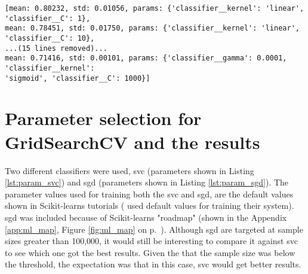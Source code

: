 \begin{lstlisting}[caption={Output from SVC tutorial (testing with linear, rbf and sigmoid)}, label={lst:svc_tutorial}] 
[mean: 0.80232, std: 0.01056, params: {'classifier__kernel': 'linear', 'classifier__C': 1}, 
mean: 0.78451, std: 0.01750, params: {'classifier__kernel': 'linear', 'classifier__C': 10}, 
...(15 lines removed)...
mean: 0.71416, std: 0.00101, params: {'classifier__gamma': 0.0001, 'classifier__kernel': 
'sigmoid', 'classifier__C': 1000}]
\end{lstlisting}

\begin{comment}
Should this be used, is this relevant? Seems a bit like whining over everything that failed, etc.

Another issue was that since few tutorials had the data sets available, it was hard to compare my results against theirs to (considering version changes).
In Scikit-learns tutorial for text data \cite{Scikitlearn.org2016h}, they have at the end task suggestions, with attached solutions in the Scikit-learn library.
When looking at the solution for the second task (sentiment analysis), I saw that they used \gls{sgd} (see \cite{Scikitlearn.org2016f}).
Looking at the suggested "road map" (see Appendix \ref{app:ml_map}, Figure \ref{fig:ml_map} on p.~\pageref{app:ml_map}), 
I accidentally misread a zero and decided to go with \gls{sgd} instead of \gls{svc}.
\vspace{0.5em}\newline
When understanding more about how GridSearchCV worked and how one could select the best parameters from it, things got back on track. 
However, when comparing it against the \gls{svc}, it turned out that the \gls{svc} got a higher score\footnote{
A comparison was done on \gls{sgd}, \gls{svc} and LinearSVC using GridSearchCV.
}. 
\end{comment}


\section{Parameter selection for GridSearchCV and the results}
\label{sec:grid_search_and_results}
Two different classifiers were used, \gls{svc} (parameters shown in Listing \ref{lst:param_svc}) and \gls{sgd} (parameters shown in Listing \ref{lst:param_sgd}).
The parameter values used for training both the \gls{svc} and \gls{sgd}, are the default values shown in Scikit-learns tutorials \cite{Scikitlearn.org2016k, Scikitlearn.org2016l} 
(\cite{Huang2008, Maas2011, Zhang2003} used default values for training their system). 
\gls{sgd} was included because of Scikit-learns "roadmap" (shown in the Appendix \ref{app:ml_map}, Figure \ref{fig:ml_map} on p.~\pageref{app:ml_map}).
Although \gls{sgd} are targeted at sample sizes greater than 100,000, it would still be interesting to compare it against \gls{svc} to see which one got the best results. 
Given the that the sample size was below the threshold, the expectation was that in this case, \gls{svc} would get better results.

